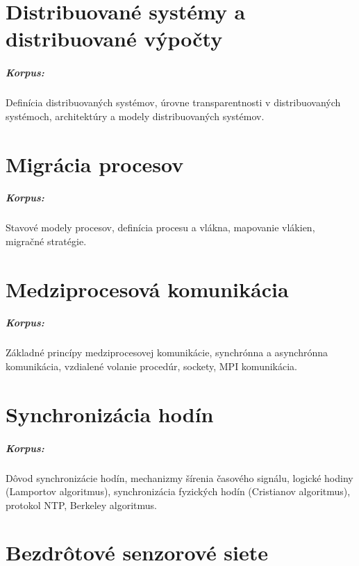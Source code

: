 \documentclass[11pt,a4paper]{report}
\begin{document}
\chapter{Distribuované systémy a distribuované výpočty}
\paragraph{Korpus:} Definícia distribuovaných systémov, úrovne transparentnosti v distribuovaných systémoch, architektúry a modely distribuovaných systémov. 

\chapter{Migrácia procesov}

\paragraph{Korpus:} Stavové modely procesov, definícia procesu a vlákna, mapovanie vlákien, migračné stratégie.

\chapter{Medziprocesová komunikácia}

\paragraph{Korpus:} Základné princípy medziprocesovej komunikácie, synchrónna a asynchrónna komunikácia, vzdialené volanie procedúr, sockety, MPI komunikácia.

\chapter{Synchronizácia hodín}

\paragraph{Korpus:} Dôvod synchronizácie hodín, mechanizmy šírenia časového signálu, logické hodiny (Lamportov algoritmus), synchronizácia fyzických hodín (Cristianov algoritmus), protokol NTP, Berkeley algoritmus.

\chapter{Bezdrôtové senzorové siete}
\end{document}
